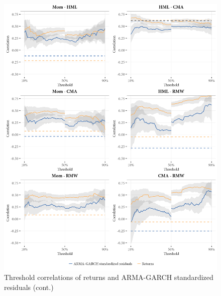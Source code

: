 \begin{figure}[H]
  \ContinuedFloat
  \centering
  \includegraphics[scale=1]{graphics/appendix_threshold_2.png}
  \footnotesize
  \caption{Threshold correlations of returns and ARMA-GARCH standardized residuals (cont.)}
\end{figure}

